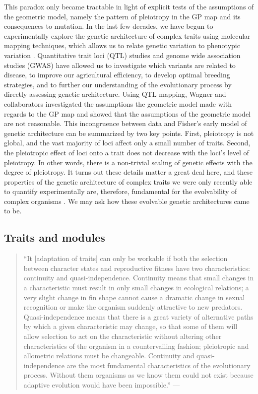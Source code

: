 \begin{refsection}
This paradox only became tractable in light of explicit tests of the
assumptions of the geometric model, namely the pattern of pleiotropy in
the GP map and its consequences to mutation. In the last few decades, we
have begun to experimentally explore the genetic architecture of complex
traits using molecular mapping techniques, which allows us to relate
genetic variation to phenotypic variation \parencite{Mackay2001-mk}.
Quantitative trait loci (QTL) studies and genome wide association
studies (GWAS) have allowed us to investigate which variants are related
to disease, to improve our agricultural efficiency, to develop optimal
breeding strategies, and to further our understanding of the
evolutionary process by directly assessing genetic architecture. Using
QTL mapping, Wagner and collaborators \parencite*{Wagner2008-oz} investigated
the assumptions the geometric model made with regards to the GP map and
showed that the assumptions of the geometric model are not reasonable.
This incongruence between data and Fisher's early model of genetic
architecture can be summarized by two key points. First, pleiotropy is
not global, and the vast majority of loci affect only a small number of
traits. Second, the pleiotropic effect of loci onto a trait does not
decrease with the loci's level of pleiotropy. In other words, there is a
non-trivial scaling of genetic effects with the degree of pleiotropy. It
turns out these details matter a great deal here, and these properties
of the genetic architecture of complex traits we were only recently able
to quantify experimentally are, therefore, fundamental for the
evolvability of complex organisms \parencite{Wagner2011-kp}. We may ask how
these evolvable genetic architectures came to be.

\subsection{Traits and modules}\label{traits-and-modules}

\begin{quote}
``It {[}adaptation of traits{]} can only be workable if both the
selection between character states and reproductive fitness have two
characteristics: continuity and quasi-independence. Continuity means
that small changes in a characteristic must result in only small changes
in ecological relations; a very slight change in fin shape cannot cause
a dramatic change in sexual recognition or make the organism suddenly
attractive to new predators. Quasi-independence means that there is a
great variety of alternative paths by which a given characteristic may
change, so that some of them will allow selection to act on the
characteristic without altering other characteristics of the organism in
a countervailing fashion; pleiotropic and allometric relations must be
changeable. Continuity and quasi-independence are the most fundamental
characteristics of the evolutionary process. Without them organisms as
we know them could not exist because adaptive evolution would have been
impossible.'' --- \textcite{Lewontin1979-iw}
\end{quote}


\end{refsection}
